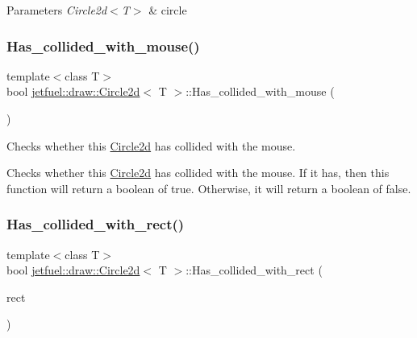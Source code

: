\begin{DoxyParams}{Parameters}
{\em Circle2d$<$\+T$>$} & circle \\
\hline
\end{DoxyParams}
\mbox{\label{classjetfuel_1_1draw_1_1Circle2d_a51ddff1ce48a2433f108af1268abbcb3}} 
\subsubsection{\texorpdfstring{Has\+\_\+collided\+\_\+with\+\_\+mouse()}{Has\_collided\_with\_mouse()}}
{\footnotesize\ttfamily template$<$class T$>$ \\
bool \hyperlink{classjetfuel_1_1draw_1_1Circle2d}{jetfuel\+::draw\+::\+Circle2d}$<$ T $>$\+::Has\+\_\+collided\+\_\+with\+\_\+mouse (\begin{DoxyParamCaption}{ }\end{DoxyParamCaption})\hspace{0.3cm}{\ttfamily [inline]}}



Checks whether this \hyperlink{classjetfuel_1_1draw_1_1Circle2d}{Circle2d} has collided with the mouse. 

Checks whether this \hyperlink{classjetfuel_1_1draw_1_1Circle2d}{Circle2d} has collided with the mouse. If it has, then this function will return a boolean of true. Otherwise, it will return a boolean of false. \mbox{\label{classjetfuel_1_1draw_1_1Circle2d_a067f431a70a3df691223b955d4a1d573}} 
\subsubsection{\texorpdfstring{Has\+\_\+collided\+\_\+with\+\_\+rect()}{Has\_collided\_with\_rect()}}
{\footnotesize\ttfamily template$<$class T$>$ \\
bool \hyperlink{classjetfuel_1_1draw_1_1Circle2d}{jetfuel\+::draw\+::\+Circle2d}$<$ T $>$\+::Has\+\_\+collided\+\_\+with\+\_\+rect (\begin{DoxyParamCaption}\item[{\hyperlink{classjetfuel_1_1draw_1_1Rect2d}{Rect2d}$<$ T $>$}]{rect }\end{DoxyParamCaption})\hspace{0.3cm}{\ttfamily [inline]}}



